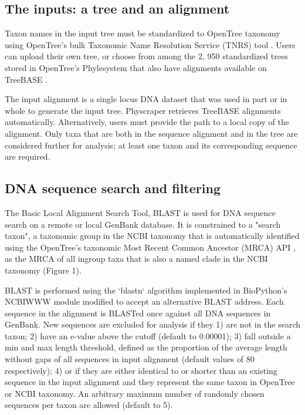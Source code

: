 \documentclass{bmcart}
\begin{document}
\subsection*{The inputs: a tree and an alignment}

Taxon names in the input tree must be standardized to OpenTree taxonomy
\cite{rees2017automated} using OpenTree's bulk Taxonomic Name Resolution Service
(TNRS) tool \cite{TNRStool}. Users can upload their
own tree, or choose from among the 2, 950 standardized trees stored in OpenTree's
Phylesystem \cite{phylesystemGithub, mctavish2015phylesystem} that also have
alignments available on TreeBASE \cite{piel2009treebase}.

The input alignment is a single locus DNA dataset that was used in part or in
whole to generate the input tree. Physcraper retrieves TreeBASE alignments
automatically. Alternatively, users must provide the path to a local copy of the
alignment.
Only taxa that are both in the sequence alignment and in the tree are considered
further for analysis; at least one taxon and its corresponding sequence are required.

\subsection*{DNA sequence search and filtering}

The Basic Local Alignment Search Tool, BLAST \cite{altschul1990basic} is used for DNA
sequence search on a remote or local GenBank database. It is constrained to a
"search taxon", a taxonomic group in the NCBI taxonomy that is automatically
identified using the OpenTree's taxonomic Most Recent Common Ancestor (MRCA) API
\cite{mrcaAPI, rees2017automated}, as the MRCA of all ingroup taxa that is
also a named clade in the NCBI taxonomy (Figure 1).

BLAST is performed using the `blastn` algorithm \cite{camacho2009blast}
implemented in BioPython's \cite{cock2009biopython} NCBIWWW module \cite{ncbiwww}
modified to accept an alternative BLAST address.
Each sequence in the alignment is BLASTed once against all DNA sequences in GenBank.
New sequences are excluded for analysis if they 1) are not in the search taxon;
2) have an e-value above the cutoff (default to 0.00001); 3) fall outside a min
and max length threshold, defined as the proportion of the average length without
gaps of all sequences in input alignment (default values of 80%
respectively); 4) or if they are either identical to or shorter than an existing
sequence in the input alignment and they represent the same taxon in OpenTree or
NCBI taxonomy.
An arbitrary maximum number of randomly chosen sequences per taxon are allowed
(default to 5).
\end{document}
